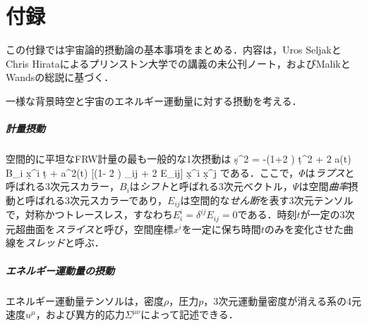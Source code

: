 
\appendix
\renewcommand{\thesection}{\Alph{section}}



\part{付録}
\label{sec:CPT}
\setcounter{equation}{0}
\renewcommand{\theequation}{A.\arabic{equation}}




この付録では宇宙論的摂動論の基本事項をまとめる．内容は，Uros SeljakとChris Hirataによるプリンストン大学での講義の未公刊ノート，およびMalikとWandsの総説\cite{Malik:2008im}に基づく．

 




一様な背景時空と宇宙のエネルギー運動量に対する摂動を考える．



\subsubsection{計量摂動}



空間的に平坦なFRW計量の最も一般的な1次摂動は
\beq
\label{equ:SVTmetric}
\d s^2 = -(1+2 \Phi) \d t^2 + 2  a(t) B_{i} \d x^i \d t + a^2(t) [(1- 2 \Psi) \delta_{ij} + 2 E_{ij}] \d x^i \d x^j 
\eeq
である．ここで，$\Phi$は\textit{ラプス}と呼ばれる3次元スカラー，$B_i$は\textit{シフト}と呼ばれる3次元ベクトル，$\Psi$は空間\textit{曲率}摂動と呼ばれる3次元スカラーであり，$E_{ij}$は空間的な\textit{せん断}を表す3次元テンソルで，対称かつトレースレス，すなわち$E^i_i = \delta^{ij} E_{ij}=0$である．時刻$t$が一定の3次元超曲面を\textit{スライス}と呼び，空間座標$x^i$を一定に保ち時間$t$のみを変化させた曲線を\textit{スレッド}と呼ぶ．



\subsubsection{エネルギー運動量の摂動}



エネルギー運動量テンソルは，密度$\rho$，圧力$p$，3次元運動量密度が消える系の4元速度$u^\mu$，および異方的応力$\Sigma^{\mu \nu}$によって記述できる．



